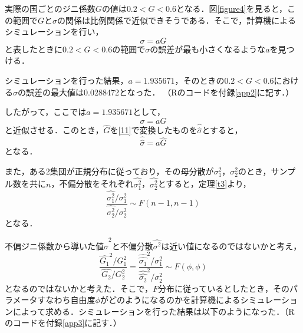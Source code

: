 \documentclass{jsarticle}
\begin{document}
実際の国ごとのジニ係数$G$の値は$0.2<G<0.6$となる\cite{URL2}．図\ref{figure4}を見ると，この範囲で$G$と$\sigma$の関係は比例関係で近似できそうである．そこで，計算機によるシミュレーションを行い，
\[ \sigma=aG \]
と表したときに$0.2<G<0.6$の範囲で$\sigma$の誤差が最も小さくなるような$a$を見つける．

シミュレーションを行った結果，$a=1.935671$，そのときの$0.2<G<0.6$における$\sigma$の誤差の最大値は0.0288472となった．
（Rのコードを付録\ref{app2}に記す．）

したがって，ここでは$a=1.935671$として，
\begin{equation}
\sigma=aG \label{11}
\end{equation}
と近似させる．このとき，$\hat{G}$を\eqref{11}で変換したものを$\hat{\hat{\sigma}}$とすると，
\[ \hat{\hat{\sigma}}=a\hat{G} \]
となる．

また，ある2集団が正規分布に従っており，その母分散が$\sigma_1^2$，$\sigma_2^2$のとき，サンプル数を共に$n$，不偏分散をそれぞれ$\hat{\sigma_1^2}$，$\hat{\sigma_2^2}$とすると，定理\ref{t3}より，
\[ \frac{\hat{\sigma_1^2}/\sigma_1^2}{\hat{\sigma_2^2}/\sigma_2^2} \sim F(n-1,n-1) \]
となる．

不偏ジニ係数から導いた値$\hat{\hat{\sigma}}^2$と不偏分散$\hat{\sigma^2}$は近い値になるのではないかと考え，
\[ \frac{\hat{G_1}^2/G_1^2}{\hat{G_2}/G_2^2} = \frac{\hat{\hat{\sigma_1}}^2/\sigma_1^2}{\hat{\hat{\sigma_2}}^2/\sigma_2^2}  \sim F(\phi, \phi) \]
となるのではないかと考えた．そこで，$F$分布に従っているとしたとき，そのパラメータすなわち自由度$\phi$がどのようになるのかを計算機によるシミュレーションによって求める．シミュレーションを行った結果は以下のようになった．（Rのコードを付録\ref{app3}に記す．）
\vspace{2mm}
\end{document}
